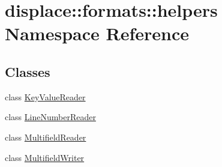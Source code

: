 \hypertarget{namespacedisplace_1_1formats_1_1helpers}{}\section{displace\+::formats\+::helpers Namespace Reference}
\label{namespacedisplace_1_1formats_1_1helpers}
\subsection*{Classes}
\begin{DoxyCompactItemize}
\item 
class \mbox{\hyperlink{classdisplace_1_1formats_1_1helpers_1_1_key_value_reader}{Key\+Value\+Reader}}
\item 
class \mbox{\hyperlink{classdisplace_1_1formats_1_1helpers_1_1_line_number_reader}{Line\+Number\+Reader}}
\item 
class \mbox{\hyperlink{classdisplace_1_1formats_1_1helpers_1_1_multifield_reader}{Multifield\+Reader}}
\item 
class \mbox{\hyperlink{classdisplace_1_1formats_1_1helpers_1_1_multifield_writer}{Multifield\+Writer}}
\end{DoxyCompactItemize}
